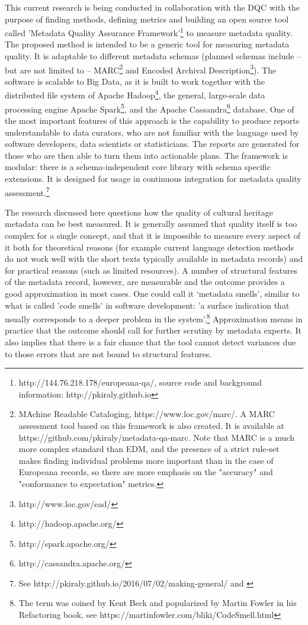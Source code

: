 This current research is being conducted in collaboration with the DQC with the purpose of finding methods, defining metrics and building an open source tool called 'Metadata Quality Assurance Framework'\footnote{http://144.76.218.178/europeana-qa/, source code and background information: http://pkiraly.github.io} to measure metadata quality. The proposed method is intended to be a generic tool for measuring metadata quality. It is adaptable to different metadata schemas (planned schemas include – but are not limited to – MARC\footnote{MAchine Readable Cataloging, https://www.loc.gov/marc/. A MARC assessment tool based on this framework is also created. It is available at https://github.com/pkiraly/metadata-qa-marc. Note that MARC is a much more complex standard than EDM, and the presence of a strict rule-set makes finding individual problems more important than in the case of Europeana records, so there are more emphasis on the "accuracy" and "conformance to expectation" metrics.} and Encoded Archival Description\footnote{http://www.loc.gov/ead/}). The software is scalable to Big Data, as it is built to work together with the distributed file system of Apache Hadoop\footnote{http://hadoop.apache.org/}, the general, large-scale data processing engine Apache Spark\footnote{http://spark.apache.org/}, and the Apache Cassandra\footnote{http://cassandra.apache.org/} database. One of the most important features of this approach is the capability to produce reports understandable to data curators, who are not familiar with the language used by software developers, data scientists or statisticians. The reports are generated for those who are then able to turn them into actionable plans. The framework is modular: there is a schema-independent core library with schema specific extensions. It is designed for usage in continuous integration for metadata quality assessment.\footnote{See http://pkiraly.github.io/2016/07/02/making-general/ and \cite{kiraly2017}}

The research discussed here questions how the quality of cultural heritage metadata can be best measured. It is generally assumed that quality itself is too complex for a single concept, and that it is impossible to measure every aspect of it both for theoretical reasons (for example current language detection methods do not work well with the short texts typically available in metadata records) and for practical reasons (such as limited resources). A number of structural features of the metadata record, however, are measurable and the outcome provides a good approximation in most cases. One could call it ‘metadata smells’, similar to what is called 'code smells' in software development: 'a surface indication that usually corresponds to a deeper problem in the system'.\footnote{The term was coined by Kent Beck and popularized by Martin Fowler in his Refactoring book, see https://martinfowler.com/bliki/CodeSmell.html} Approximation means in practice that the outcome should call for further scrutiny by metadata experts. It also implies that there is a fair chance that the tool cannot detect variances due to those errors that are not bound to structural features.

